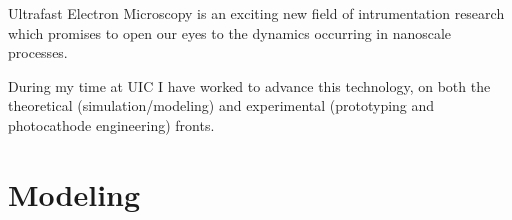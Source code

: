
Ultrafast Electron Microscopy is an exciting new field of intrumentation research which promises to open our eyes to the dynamics occurring in nanoscale processes.

During my time at UIC I have worked to advance this technology, on both the theoretical (simulation/modeling) and experimental (prototyping and photocathode engineering) fronts.

\section{Modeling}

